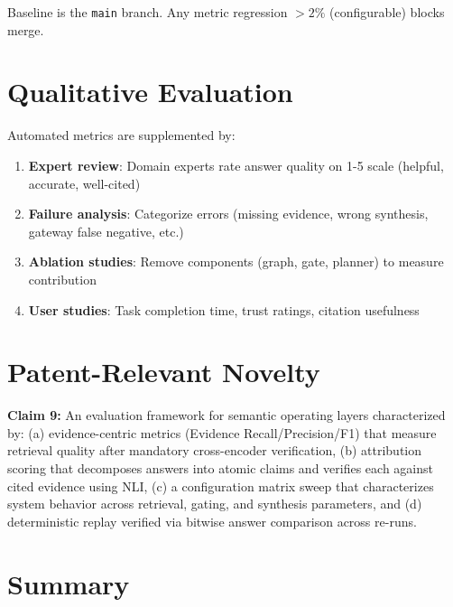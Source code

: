 Baseline is the \texttt{main} branch. Any metric regression $> 2\%$ (configurable) blocks merge.

\section{Qualitative Evaluation}
\label{sec:eval:qualitative}

Automated metrics are supplemented by:

\begin{enumerate}
  \item \textbf{Expert review}: Domain experts rate answer quality on 1-5 scale (helpful, accurate, well-cited)
  \item \textbf{Failure analysis}: Categorize errors (missing evidence, wrong synthesis, gateway false negative, etc.)
  \item \textbf{Ablation studies}: Remove components (graph, gate, planner) to measure contribution
  \item \textbf{User studies}: Task completion time, trust ratings, citation usefulness
\end{enumerate}

\section{Patent-Relevant Novelty}
\label{sec:eval:patent}

\begin{patentclaim}
\textbf{Claim 9:} An evaluation framework for semantic operating layers characterized by: (a) evidence-centric metrics (Evidence Recall/Precision/F1) that measure retrieval quality after mandatory cross-encoder verification, (b) attribution scoring that decomposes answers into atomic claims and verifies each against cited evidence using NLI, (c) a configuration matrix sweep that characterizes system behavior across retrieval, gating, and synthesis parameters, and (d) deterministic replay verified via bitwise answer comparison across re-runs.
\end{patentclaim}

\section{Summary}
\label{sec:eval:summary}

